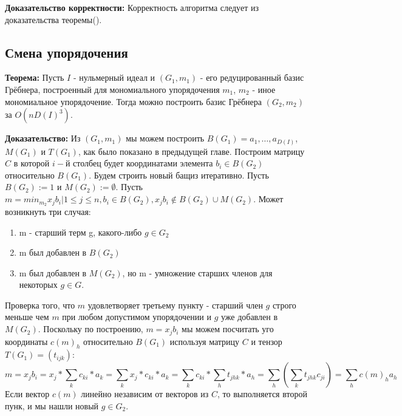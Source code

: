 \documentclass{article}
\begin{document}
    \newpage    
    \textbf{Доказательство корректности:}
        Корректность алгоритма следует из доказательства теоремы(). 

    \newpage
    \subsection{Смена упорядочения}
    \textbf{Теорема:} Пусть $I$ - нульмерный идеал и $(G_1, m_1)$ - его редуцированный 
    базис Грёбнера, построенный для мономиального упорядочения $m_1$, $m_2$ - иное мономиальное упорядочение. Тогда можно построить
    базис Грёбнера $(G_2, m_2)$ за $O(nD(I)^3)$.
    
    \textbf{Доказательство:} Из $(G_1, m_1)$ мы можем построить $B(G_1) = {a_1,\ldots,a_{D(I)}}$, $M(G_1)$ и $T(G_1)$, как
    было показано в предыдущей главе. Построим матрицу $C$ в которой $i-$й столбец будет координатами элемента $b_i \in B(G_2)$
    относительно $B(G_1)$.
    Будем строить новый бащиз итеративно.
    Пусть $B(G_2) := {1}$ и $M(G_2) := \emptyset$. Пусть $m = min_{m_2} {x_jb_i | 1\leq j \leq n, b_i \in B(G_2), 
    x_jb_i\notin B(G_2)\cup M(G_2)}$. Может возникнуть три случая:
    \begin{enumerate}
        \item m - старший терм g, какого-либо $g \in G_2$
        \item m был добавлен в $B(G_2)$
        \item m был добавлен в $M(G_2)$, но m - умножение старших членов для некоторых $g \in G$.
    \end{enumerate}
    Проверка того, что $m$ удовлетворяет третьему пункту - старший член $g$ строго меньше чем $m$ при любом допустимом упорядочении
    и $g$ уже добавлен в $M(G_2)$.
    Поскольку по построению, $m=x_jb_i$ мы можем посчитать уго координаты $c(m)_h$ относительно $B(G_1)$ используя матрицу $C$ и тензор
    $T(G_1) = (t_{ijk})$:
    $$m=x_jb_i=x_j*\sum_k c_{ki}*a_k = \sum_k x_j*c_{ki}*a_k = \sum_k c_{ki}*\sum_h t_{jhk}*a_h = \sum_h (\sum_k t_{jhk}c_{ji}) = \sum_h c(m)_ha_h$$
    Если вектор $c(m)$ линейно независим от векторов из $C$, то выполняется второй пунк, и мы нашли новый $g \in G_2$.
    \newpage
\end{document}
